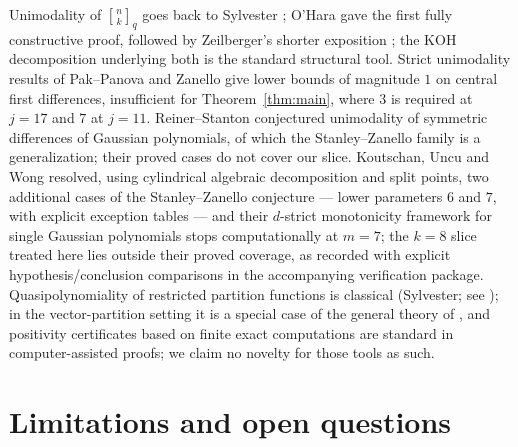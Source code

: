 \documentclass[11pt]{article}
\theoremstyle{definition}
\newcommand{\gauss}[2]{\genfrac{[}{]}{0pt}{0}{#1}{#2}_q}
\begin{document}
Unimodality of $\gauss{n}{k}$ goes back to Sylvester \cite{sylvester1878}; O'Hara \cite{ohara}
gave the first fully constructive proof, followed by Zeilberger's shorter exposition
\cite{zeilberger}; the KOH decomposition underlying both is the standard structural tool. Strict
unimodality results of Pak--Panova \cite{pakpanova} and Zanello \cite{zanello2015} give lower bounds
of magnitude $1$ on central first differences, insufficient for Theorem~\ref{thm:main}, where $3$ is
required at $j=17$ and $7$ at $j=11$. Reiner--Stanton \cite{reinerstanton} conjectured unimodality
of symmetric differences of Gaussian polynomials, of which the Stanley--Zanello family is a
generalization; their proved cases do not cover our slice. Koutschan, Uncu and Wong \cite{kuw}
resolved, using cylindrical algebraic decomposition and split points, two additional cases of the
Stanley--Zanello conjecture --- lower parameters $6$ and $7$, with explicit exception tables --- and
their $d$-strict monotonicity framework for single Gaussian polynomials stops computationally at
$m=7$; the $k=8$ slice treated here lies outside their proved coverage, as recorded with explicit
hypothesis/conclusion comparisons in the accompanying verification package. Quasipolynomiality of
restricted partition functions is classical (Sylvester; see \cite[Ch.~4]{stanleyec1}); in the
vector-partition setting it is a special case of the general theory of \cite{sturmfels}, and
positivity certificates based on finite exact computations are
standard in computer-assisted proofs; we claim no novelty for those tools as such.

\section{Limitations and open questions}\label{sec:open}
\end{document}
